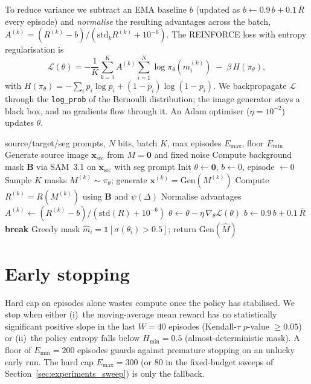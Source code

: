 To reduce variance we subtract an EMA baseline $b$ (updated as $b \leftarrow 0.9\,b + 0.1\,\overline{R}$ every episode) and \emph{normalise} the resulting advantages across the batch, $A^{(k)} = (R^{(k)} - b) / (\text{std}_k R^{(k)} + 10^{-6})$. The REINFORCE loss with entropy regularisation is
\begin{equation}
\mathcal{L}(\theta) = - \frac{1}{K}\sum_{k=1}^{K} A^{(k)} \sum_{i=1}^{N} \log \pi_\theta(m_i^{(k)}) \;-\; \beta\, H(\pi_\theta),
\end{equation}
with $H(\pi_\theta) = -\sum_i p_i \log p_i + (1-p_i)\log(1-p_i)$. We backpropagate $\mathcal{L}$ through the \texttt{log\_prob} of the Bernoulli distribution; the image generator stays a black box, and no gradients flow through it. An Adam optimiser ($\eta=10^{-2}$) updates $\theta$.

\begin{algorithm}[H]
\caption{REINFORCE on Bernoulli path logits}
\label{alg::reinforce}
\begin{algorithmic}[1]
\Require source/target/seg prompts, $N$ bits, batch $K$, max episodes $E_{\max}$, floor $E_{\min}$
\State Generate source image $\mathbf{x}_{\text{src}}$ from $M=\mathbf{0}$ and fixed noise
\State Compute background mask $\mathbf{B}$ via SAM~3.1 on $\mathbf{x}_{\text{src}}$ with seg prompt
\State Init $\theta \gets \mathbf{0}$, $b \gets 0$, episode $\gets 0$
    \State Sample $K$ masks $M^{(k)} \sim \pi_\theta$; generate $\mathbf{x}^{(k)} = \text{Gen}(M^{(k)})$
    \State Compute $R^{(k)} = R(M^{(k)})$ using $\mathbf{B}$ and $\psi(\Delta)$
    \State Normalise advantages $A^{(k)} \leftarrow (R^{(k)} - b)/(\text{std}(R)+10^{-6})$
    \State $\theta \gets \theta - \eta\,\nabla_\theta \mathcal{L}(\theta)$
    \State $b \gets 0.9\,b + 0.1\,\overline{R}$
        \State \textbf{break}
    \EndIf
\EndFor
\State Greedy mask $\hat{m}_i = \mathbb{1}[\sigma(\theta_i) > 0.5]$; return $\text{Gen}(\hat{M})$
\end{algorithmic}
\end{algorithm}

\section{Early stopping}

Hard cap on episodes alone wastes compute once the policy has stabilised. We stop when either (i)~the moving-average mean reward has no statistically significant positive slope in the last $W=40$ episodes (Kendall-$\tau$ $p$-value $\ge 0.05$) or (ii)~the policy entropy falls below $H_{\min}=0.5$ (almost-deterministic mask). A floor of $E_{\min}=200$ episodes guards against premature stopping on an unlucky early run. The hard cap $E_{\max}=300$ (or $80$ in the fixed-budget sweeps of Section~\ref{sec:experiments_sweep}) is only the fallback.

